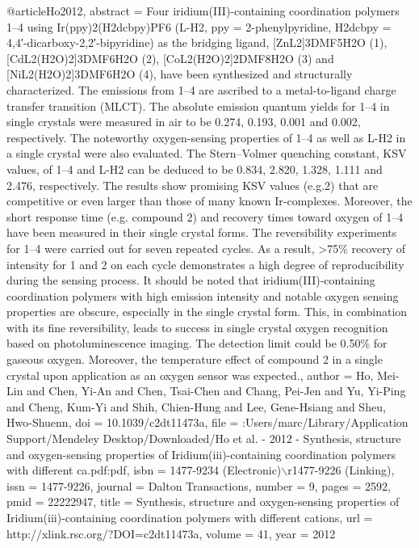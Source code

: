 @article{Ho2012,
abstract = {Four iridium(III)-containing coordination polymers 1–4 using Ir(ppy)2(H2dcbpy)PF6 (L-H2, ppy = 2-phenylpyridine, H2dcbpy = 4,4′-dicarboxy-2,2′-bipyridine) as the bridging ligand, [ZnL2]{\textperiodcentered}3DMF{\textperiodcentered}5H2O (1), [CdL2(H2O)2]{\textperiodcentered}3DMF{\textperiodcentered}6H2O (2), [CoL2(H2O)2]{\textperiodcentered}2DMF{\textperiodcentered}8H2O (3) and [NiL2(H2O)2]{\textperiodcentered}3DMF{\textperiodcentered}6H2O (4), have been synthesized and structurally characterized. The emissions from 1–4 are ascribed to a metal-to-ligand charge transfer transition (MLCT). The absolute emission quantum yields for 1–4 in single crystals were measured in air to be 0.274, 0.193, 0.001 and 0.002, respectively. The noteworthy oxygen-sensing properties of 1–4 as well as L-H2 in a single crystal were also evaluated. The Stern–Volmer quenching constant, KSV values, of 1–4 and L-H2 can be deduced to be 0.834, 2.820, 1.328, 1.111 and 2.476, respectively. The results show promising KSV values (e.g.2) that are competitive or even larger than those of many known Ir-complexes. Moreover, the short response time (e.g. compound 2) and recovery times toward oxygen of 1–4 have been measured in their single crystal forms. The reversibility experiments for 1–4 were carried out for seven repeated cycles. As a result, {\textgreater}75{\%} recovery of intensity for 1 and 2 on each cycle demonstrates a high degree of reproducibility during the sensing process. It should be noted that iridium(III)-containing coordination polymers with high emission intensity and notable oxygen sensing properties are obscure, especially in the single crystal form. This, in combination with its fine reversibility, leads to success in single crystal oxygen recognition based on photoluminescence imaging. The detection limit could be 0.50{\%} for gaseous oxygen. Moreover, the temperature effect of compound 2 in a single crystal upon application as an oxygen sensor was expected.},
author = {Ho, Mei-Lin and Chen, Yi-An and Chen, Tsai-Chen and Chang, Pei-Jen and Yu, Yi-Ping and Cheng, Kum-Yi and Shih, Chien-Hung and Lee, Gene-Hsiang and Sheu, Hwo-Shuenn},
doi = {10.1039/c2dt11473a},
file = {:Users/marc/Library/Application Support/Mendeley Desktop/Downloaded/Ho et al. - 2012 - Synthesis, structure and oxygen-sensing properties of Iridium(iii)-containing coordination polymers with different ca.pdf:pdf},
isbn = {1477-9234 (Electronic)$\backslash$r1477-9226 (Linking)},
issn = {1477-9226},
journal = {Dalton Transactions},
number = {9},
pages = {2592},
pmid = {22222947},
title = {{Synthesis, structure and oxygen-sensing properties of Iridium(iii)-containing coordination polymers with different cations}},
url = {http://xlink.rsc.org/?DOI=c2dt11473a},
volume = {41},
year = {2012}
}
